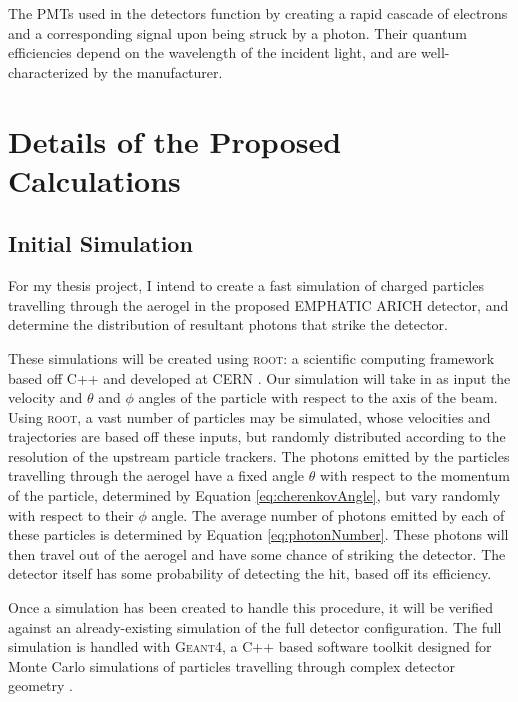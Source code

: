 The PMTs used in the detectors function by creating a rapid cascade of electrons and a corresponding signal upon being struck by a photon. Their quantum efficiencies depend on the wavelength of the incident light, and are well-characterized by the manufacturer.


\section{Details of the Proposed Calculations} 
\subsection{Initial Simulation}
\label{sec:experiment}
For my thesis project, I intend to create a fast simulation of charged particles travelling through the aerogel in the proposed EMPHATIC ARICH detector, and determine the distribution of resultant photons that strike the detector. 

These simulations will be created using \textsc{root}: a scientific computing framework based off C++ and developed at CERN \cite{root}. Our simulation will take in as input the velocity and $\theta$ and $\phi$ angles of the particle with respect to the axis of the beam. Using \textsc{root}, a vast number of particles may be simulated, whose velocities and trajectories are based off these inputs, but randomly distributed according to the resolution of the upstream particle trackers. The photons emitted by the particles travelling through the aerogel have a fixed angle $\theta$ with respect to the momentum of the particle, determined by Equation \ref{eq:cherenkovAngle}, but vary randomly with respect to their $\phi$ angle. The average number of photons emitted by each of these particles is determined by Equation \ref{eq:photonNumber}. These photons will then travel out of the aerogel and have some chance of striking the detector. The detector itself has some probability of detecting the hit, based off its efficiency. 

Once a simulation has been created to handle this procedure, it will be verified against an already-existing simulation of the full detector configuration. The full simulation is handled with \textsc{Geant4}, a C++ based software toolkit designed for Monte Carlo simulations of particles travelling through complex detector geometry  \cite{geant4}.

